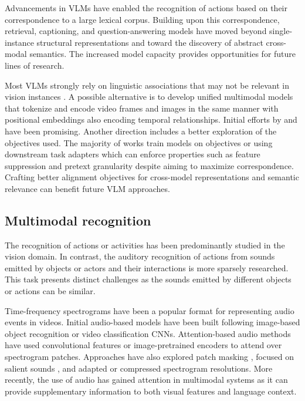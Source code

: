 Advancements in VLMs have enabled the recognition of actions based on their correspondence to a large lexical corpus. Building upon this correspondence, retrieval, captioning, and question-answering models have moved beyond single-instance structural representations and toward the discovery of abstract cross-modal semantics. The increased model capacity provides opportunities for future lines of research.

Most VLMs strongly rely on linguistic associations that may not be relevant in vision instances . A possible alternative is to develop unified multimodal models that tokenize and encode video frames and images in the same manner with positional embeddings also encoding temporal relationships. Initial efforts by  and  have been promising. Another direction includes a better exploration of the objectives used. The majority of works train models on objectives  or using downstream task adapters  which can enforce properties such as feature suppression  and pretext granularity  despite aiming to maximize correspondence. Crafting better alignment objectives for cross-model representations and semantic relevance can benefit future VLM approaches.  


\subsection{Multimodal recognition} 
\label{sec:recognition::audio}

The recognition of actions or activities has been predominantly studied in the vision domain. In contrast, the auditory recognition of actions from sounds emitted by objects or actors and their interactions is more sparsely researched. This task presents distinct challenges as the sounds emitted by different objects or actions can be similar. 

Time-frequency spectrograms have been a popular format for representing audio events in videos. Initial audio-based models have been built following image-based object recognition  or video classification  CNNs. Attention-based audio methods have used convolutional features  or image-pretrained encoders  to attend over spectrogram patches. Approaches have also explored patch masking , focused on salient sounds , and adapted  or compressed  spectrogram resolutions. More recently, the use of audio has gained attention in multimodal systems as it can provide supplementary information to both visual features and language context. 


